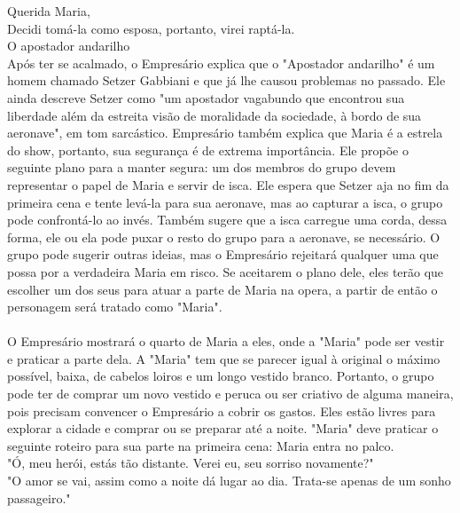 %
\vfill
%
Querida Maria,\vspace{0.6cm}\\
Decidi tomá-la como esposa, portanto, virei raptá-la.\vspace{0.6cm}\\
\hspace*{0.5cm}O apostador andarilho\\
%
\newpage
%
Após ter se acalmado, o Empresário explica que o "Apostador andarilho" é um homem chamado Setzer Gabbiani e que já lhe causou problemas no passado.
Ele ainda descreve Setzer como "um apostador vagabundo que encontrou sua liberdade além da estreita visão de moralidade da sociedade, à bordo de sua aeronave", em tom sarcástico.
Empresário também explica que Maria é a estrela do show, portanto, sua segurança é de extrema importância.
Ele propõe o seguinte plano para a manter segura: um dos membros do grupo devem representar o papel de Maria e servir de isca.
Ele espera que Setzer aja no fim da primeira cena e tente levá-la para sua aeronave, mas ao capturar a isca, o grupo pode confrontá-lo ao invés. Também sugere que a isca carregue uma corda, dessa forma, ele ou ela pode puxar o resto do grupo para a aeronave, se necessário.
O grupo pode sugerir outras ideias, mas o Empresário rejeitará qualquer uma que possa por a verdadeira Maria em risco.
Se aceitarem o plano dele, eles terão que escolher um dos seus para atuar a parte de Maria na opera, a partir de então o personagem será tratado como "Maria".
%
\vfill
%
\\\\
%
O Empresário mostrará o quarto de Maria a eles, onde a "Maria" pode ser vestir e praticar a parte dela.
A "Maria" tem que se parecer igual à original o máximo possível, baixa, de cabelos loiros e um longo vestido branco.
Portanto, o grupo pode ter de comprar um novo vestido e peruca ou ser criativo de alguma maneira, pois precisam convencer o Empresário a cobrir os gastos.
Eles estão livres para explorar a cidade e comprar ou se preparar até a noite. "Maria" deve praticar o seguinte roteiro para sua parte na primeira cena:
%
\vfill
%
Maria entra no palco.\vspace{0.2cm}\\
"Ó, meu herói, estás tão distante. Verei eu, seu sorriso novamente?"\vspace{0.2cm}\\ 
"O amor se vai, assim como a noite dá lugar ao dia. Trata-se apenas de um sonho passageiro."\vspace{0.2cm}\\ 

